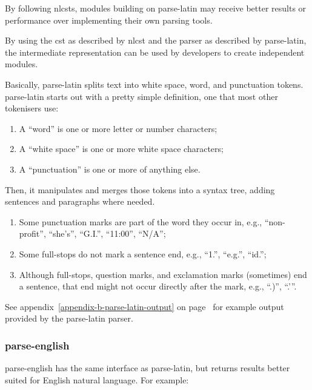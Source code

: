 \begin{enumerate}
By following \glspl{nlcst}, modules building on parse-latin may receive
better results or performance over implementing their own parsing tools.

By using the \gls{cst} as described by \gls{nlcst} and the parser as
described by parse-latin, the intermediate representation can be used by
developers to create independent modules.

Basically, parse-latin splits text into white space, word, and
punctuation tokens. parse-latin starts out with a pretty simple
definition, one that most other tokenisers use:

\begin{enumerate}
\item
  A ``word'' is one or more letter or number characters;
\item
  A ``white space'' is one or more white space characters;
\item
  A ``punctuation'' is one or more of anything else.
\end{enumerate}

Then, it manipulates and merges those tokens into a syntax tree, adding
sentences and paragraphs where needed.

\begin{enumerate}
\item
  Some punctuation marks are part of the word they occur in, e.g.,
  ``non-profit'', ``she's'', ``G.I.'', ``11:00'', ``N\slash A'';
\item
  Some full-stops do not mark a sentence end, e.g., ``1.'', ``e.g.'',
  ``id.'';
\item
  Although full-stops, question marks, and exclamation marks (sometimes)
  end a sentence, that end might not occur directly after the mark,
  e.g., ``.)'', ``.'{}''.
\end{enumerate}

See appendix~\ref{appendix-b-parse-latin-output} on
page~\pageref{appendix-b-parse-latin-output} for example output provided
by the parse-latin parser.

\subsubsection{parse-english}\label{parse-english}

parse-english has the same interface as parse-latin, but returns results
better suited for English natural language. For example:


\end{enumerate}
